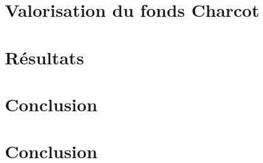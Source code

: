 \documentclass[a4paper,12pt]{report}
\begin{document}
\chapter{Valorisation du fonds Charcot}
\label{3_corpus}

%
\chapter{Résultats}
\label{4_methodo}

%

\clearpage
{}
{} %
\chapter*{Conclusion}

\label{5_conclusion}
%
\chapter*{Conclusion}


\newpage

\nocite{*}




\end{document}
